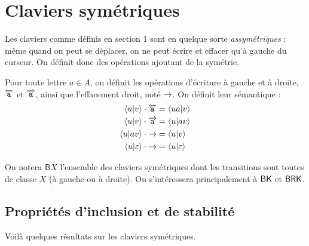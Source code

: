 \documentclass[12pt, a4paper]{article}
\begin{document}
    \section{Claviers symétriques}
    Les claviers comme définis en section 1 sont en quelque sorte \emph{assymétriques} : même quand on peut se déplacer, on ne peut écrire et effacer qu'à gauche du curseur.
    On définit donc des opérations ajoutant de la symétrie.
    \begin{defopsym}
        Pour toute lettre $a \in A$, on définit les opérations d'écriture à gauche et à droite, $\overleftarrow{\mathtt{a}}$ et $\overrightarrow{\mathtt{a}}$, ainsi que l'effacement droit, noté $\mathord{\rightarrow}$.
        On définit leur sémantique :
        \begin{align*}
            \left\langle u \middle| v \right\rangle \cdot \overleftarrow{\mathtt{a}} &= \left\langle ua \middle| v \right\rangle   \\
            \left\langle u \middle| v \right\rangle \cdot \overrightarrow{\mathtt{a}} &= \left\langle u \middle| av \right\rangle   \\
            \left\langle u \middle| av \right\rangle \cdot \mathord{\rightarrow} &= \left\langle u \middle| v \right\rangle        \\
            \left\langle u \middle| \varepsilon \right\rangle \cdot \mathord{\rightarrow} &= \left\langle u \middle| \varepsilon \right\rangle
        \end{align*}
    \end{defopsym}
    On notera $\mathsf{B}X$ l'ensemble des claviers symétriques dont les transitions sont toutes de classe $X$ (à gauche ou à droite). On s'intéressera principalement à $\mathsf{BK}$ et $\mathsf{BRK}$.
    \subsection{Propriétés d'inclusion et de stabilité}
    Voilà quelques résultats sur les claviers symétriques.
\end{document}
